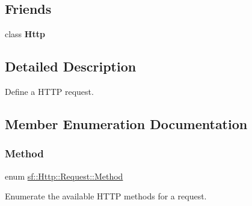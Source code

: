 \subsection*{Friends}
\begin{DoxyCompactItemize}
\item 
\mbox{\label{classsf_1_1_http_1_1_request_aba95e2a7762bb5df986048b05d03a22e}} 
class {\bfseries Http}
\end{DoxyCompactItemize}


\subsection{Detailed Description}
Define a H\+T\+TP request. 

\subsection{Member Enumeration Documentation}
\mbox{\label{classsf_1_1_http_1_1_request_a620f8bff6f43e1378f321bf53fbf5598}} 
\subsubsection{\texorpdfstring{Method}{Method}}
{\footnotesize\ttfamily enum \hyperlink{classsf_1_1_http_1_1_request_a620f8bff6f43e1378f321bf53fbf5598}{sf\+::\+Http\+::\+Request\+::\+Method}}



Enumerate the available H\+T\+TP methods for a request. 

